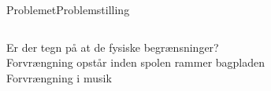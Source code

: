 \begin{frame}{Problemet}{Problemstilling}
\begin{columns}
\begin{column}{0.3\textwidth}
	Er der tegn på at de fysiske begrænsninger? \\
	\vspace{5mm}
	Forvrængning opstår inden spolen rammer bagpladen \\
	\vspace{5mm}
	Forvrængning i musik
\end{column}
\begin{column}{0.65\textwidth}
\begin{figure}[H]
	\centering
	
\end{figure}
\end{column}
\end{columns}
\end{frame}

